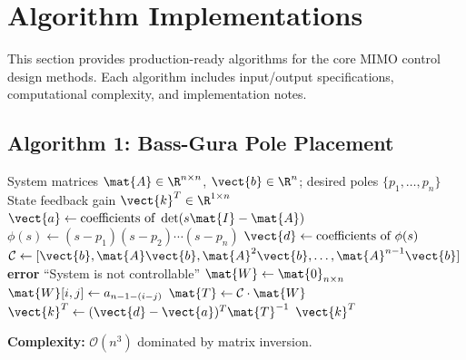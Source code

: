 \section{Algorithm Implementations}
\label{sec:algorithms}

This section provides production-ready algorithms for the core MIMO control design methods. Each algorithm includes input/output specifications, computational complexity, and implementation notes.

\subsection{Algorithm 1: Bass-Gura Pole Placement}

\begin{algorithm}[H]
\caption{Bass-Gura Algorithm for Single-Input Pole Placement}
\label{alg:bass_gura}
\begin{algorithmic}[1]
\REQUIRE System matrices $\mat{A} \in \R^{n \times n}$, $\vect{b} \in \R^{n}$; desired poles $\{p_1, \ldots, p_n\}$
\ENSURE State feedback gain $\vect{k}^T \in \R^{1 \times n}$
\STATE
{}
\STATE $\vect{a} \gets \text{coefficients of } \det(s\mat{I} - \mat{A})$ \COMMENT{$[a_0, a_1, \ldots, a_{n-1}]$}
\STATE
{}
\STATE $\phi(s) \gets (s - p_1)(s - p_2)\cdots(s - p_n)$
\STATE $\vect{d} \gets \text{coefficients of } \phi(s)$ \COMMENT{$[d_0, d_1, \ldots, d_{n-1}]$}
\STATE
{}
\STATE $\mathcal{C} \gets [\vect{b}, \mat{A}\vect{b}, \mat{A}^2\vect{b}, \ldots, \mat{A}^{n-1}\vect{b}]$
    \STATE \textbf{error} ``System is not controllable''
\ENDIF
\STATE
{}
\STATE $\mat{W} \gets \mat{0}_{n \times n}$
        \STATE $\mat{W}[i,j] \gets a_{n-1-(i-j)}$ 
    \ENDFOR
\ENDFOR
\STATE
{}
\STATE $\mat{T} \gets \mathcal{C} \cdot \mat{W}$
\STATE $\vect{k}^T \gets (\vect{d} - \vect{a})^T \mat{T}^{-1}$
\STATE
\RETURN $\vect{k}^T$
\end{algorithmic}
\end{algorithm}

\textbf{Complexity:} $\mathcal{O}(n^3)$ dominated by matrix inversion.

